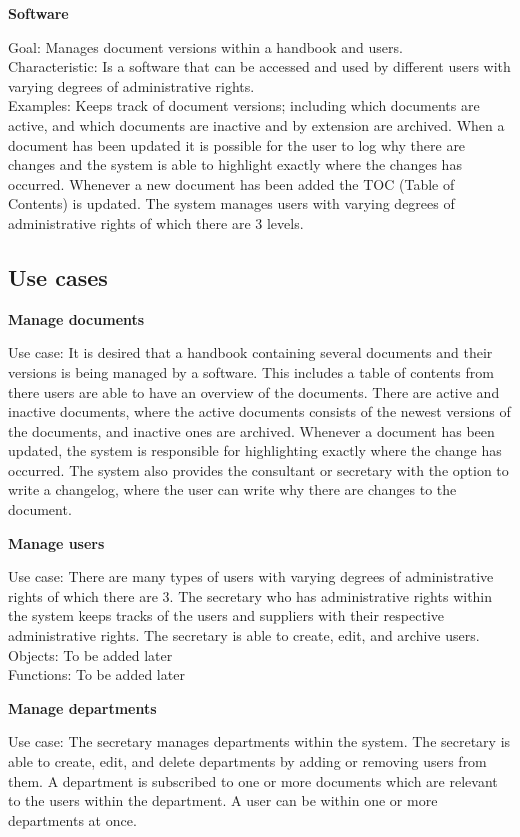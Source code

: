 \textbf{Software}

Goal: Manages document versions within a handbook and users.
\\
Characteristic: Is a software that can be accessed and used by different users with varying degrees of administrative rights.
\\
Examples: Keeps track of document versions; including which documents are active, and which documents are inactive and by extension are archived. When a document has been updated it is possible for the user to log why there are changes and the system is able to highlight exactly where the changes has occurred. Whenever a new document has been added the TOC (Table of Contents) is updated. The system manages users with varying degrees of administrative rights of which there are 3 levels.


\subsection{Use cases}

\textbf{Manage documents}

Use case: It is desired that a handbook containing several documents and their versions is being managed by a software. This includes a table of contents from there users are able to have an overview of the documents. There are active and inactive documents, where the active documents consists of the newest versions of the documents, and inactive ones are archived. Whenever a document has been updated, the system is responsible for highlighting exactly where the change has occurred. The system also provides the consultant or secretary with the option to write a changelog, where the user can write why there are changes to the document.

\textbf{Manage users}

Use case: There are many types of users with varying degrees of administrative rights of which there are 3. The secretary who has administrative rights within the system keeps tracks of the users and suppliers with their respective administrative rights. The secretary is able to create, edit, and archive users.
\\
Objects: To be added later
\\
Functions: To be added later

\textbf{Manage departments}

Use case: The secretary manages departments within the system. The secretary is able to create, edit, and delete departments by adding or removing users from them. A department is subscribed to one or more documents which are relevant to the users within the department. A user can be within one or more departments at once.

